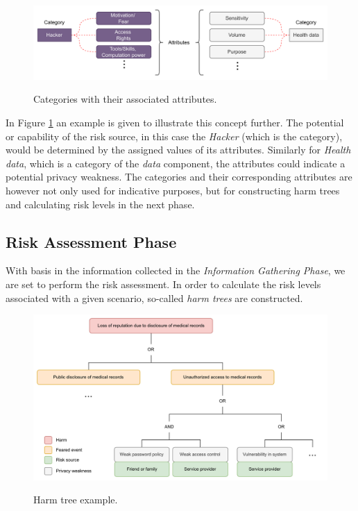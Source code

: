 \begin{figure}[hbt!]
  \centering
  \includegraphics[width=\textwidth]{pictures/cat_att.png}
  \caption{}{Categories with their associated attributes.}
  \label{fig:cat_att}
\end{figure}

In Figure \ref{fig:cat_att} an example is given to illustrate this concept
further. The potential or capability of the risk source, in this case the
\textit{Hacker} (which is the category), would be determined by the assigned
values of its attributes. Similarly for \textit{Health data}, which is a
category of the \textit{data} component, the attributes could indicate a
potential privacy weakness. The categories and their corresponding attributes
are however not only used for indicative purposes, but for constructing harm
trees and calculating risk levels in the next phase.

\subsection{Risk Assessment Phase}
With basis in the information collected in the \textit{Information Gathering
Phase}, we are set to perform the risk assessment. In order to calculate the
risk levels associated with a given scenario, so-called \textit{harm trees} are
constructed.

\begin{figure}[hbt!]
  \centering
  \includegraphics[width=\textwidth]{pictures/harm_tree_ex.png}
  \caption{}{Harm tree example.}
  \label{fig:harm_tree_ex}
\end{figure}

